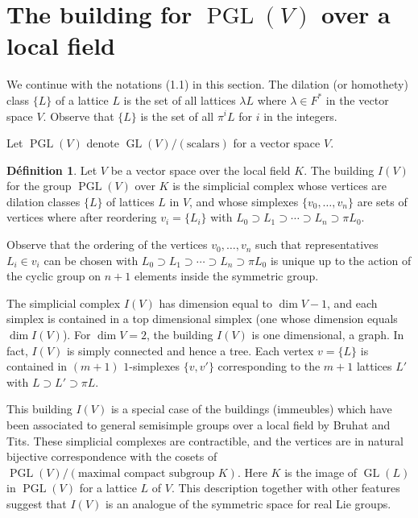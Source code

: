 \documentclass[12pt,a4paper]{article}
\theoremstyle{plain}
\theoremstyle{definition}
\newtheorem{definition}{D\'efinition}[section]
\theoremstyle{remark}
\DeclareMathOperator{\GL}{GL}
\DeclareMathOperator{\PGL}{PGL}
\begin{document}
\section{The building for $\PGL(V)$ over a local field}

We continue with the notations (1.1) in this section. The dilation (or 
homothety) class $\{L\}$ of a lattice $L$ is the set of all lattices 
$\lambda L$ where $\lambda \in F^*$ in the vector space $V$. Observe that 
$\{L\}$ is the set of all $\pi^i L$ for $i$ in the integers.

Let $\PGL(V)$ denote $\GL(V)/(\text{scalars})$ for a vector space $V$.

\begin{definition}
Let $V$ be a vector space over the local field $K$. The building $I(V)$ for 
the group $\PGL(V)$ over $K$ is the simplicial complex whose vertices are 
dilation classes $\{L\}$ of lattices $L$ in $V$, and whose simplexes 
$\{v_0, \ldots, v_n\}$ are sets of vertices where after reordering 
$v_i = \{L_i\}$ with $L_0 \supset L_1 \supset \cdots \supset L_n \supset \pi L_0$.
\end{definition}

Observe that the ordering of the vertices $v_0, \ldots, v_n$ such that 
representatives $L_i \in v_i$ can be chosen with 
$L_0 \supset L_1 \supset \cdots \supset L_n \supset \pi L_0$ is unique up to the 
action of the cyclic group on $n+1$ elements inside the symmetric group.

The simplicial complex $I(V)$ has dimension equal to $\dim V - 1$, and each 
simplex is contained in a top dimensional simplex (one whose dimension equals 
$\dim I(V)$). For $\dim V = 2$, the building $I(V)$ is one dimensional, a 
graph. In fact, $I(V)$ is simply connected and hence a tree. Each vertex 
$v = \{L\}$ is contained in $(m+1)$ $1$-simplexes $\{v,v'\}$ corresponding to 
the $m+1$ lattices $L'$ with $L \supset L' \supset \pi L$.

This building $I(V)$ is a special case of the buildings (immeubles) which 
have been associated to general semisimple groups over a local field by 
Bruhat and Tits. These simplicial complexes are contractible, and the 
vertices are in natural bijective correspondence with the cosets of 
$\PGL(V)/(\text{maximal compact subgroup } K)$. Here $K$ is the image of 
$\GL(L)$ in $\PGL(V)$ for a lattice $L$ of $V$. This description together 
with other features suggest that $I(V)$ is an analogue of the symmetric 
space for real Lie groups.
\end{document}

